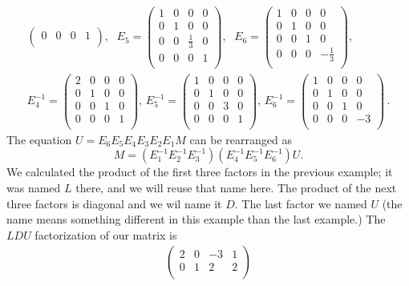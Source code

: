 \begin{example}
\begin{equation*}
\begin{aligned}
\begin{pmatrix}
0&0&0&1\\
\end{pmatrix} , \, ~~
E_5=
\begin{pmatrix}
1&0&0&0\\
0&1&0&0\\
0&0&\frac13&0\\
0&0&0&1\\
\end{pmatrix} , \, ~~
E_6=
\begin{pmatrix}
1&0&0&0\\
0&1&0&0\\
0&0&1&0\\
0&0&0&-\frac13\\
\end{pmatrix} , \, 
\\[3mm]
E_4^{-1}=
\begin{pmatrix}
2&0&0&0\\
0&1&0&0\\
0&0&1&0\\
0&0&0&1\\
\end{pmatrix} , \, 
E_5^{-1}=
\begin{pmatrix}
1&0&0&0\\
0&1&0&0\\
0&0&3&0\\
0&0&0&1\\
\end{pmatrix} , \, 
E_6^{-1}=
\begin{pmatrix}
1&0&0&0\\
0&1&0&0\\
0&0&1&0\\
0&0&0&-3\\
\end{pmatrix} \, .
\end{aligned}
\end{equation*}
The equation $U=E_6E_5E_4E_3E_2E_1 M$ can be rearranged as
\[M=(E_1^{-1}E_2^{-1}E_3^{-1})(E_4^{-1}E_5^{-1}E_6^{-1})U.\] 
We calculated the product of the first three factors in the previous example; it was named $L$ there, and we will reuse that name here. The product of the next three factors is diagonal and we wil name it $D$. The last factor we named $U$ (the name means something different in this example than the last example.) The $LDU$ factorization of our matrix is
\begin{eqnarray*}
\begin{pmatrix}
2&0&-3&1\\
0&1&2&2\\

\end{pmatrix}
\end{eqnarray*}
\end{example}

